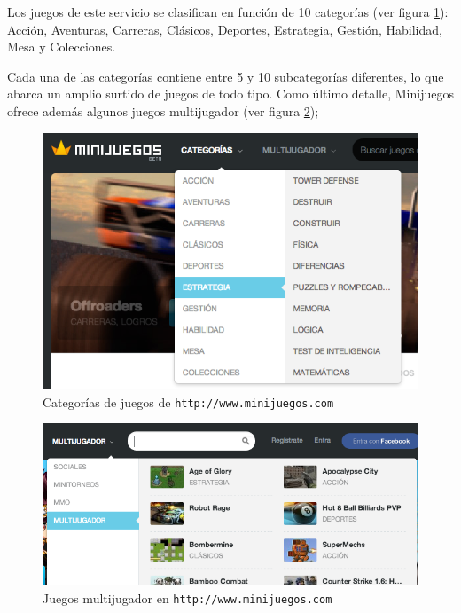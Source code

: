 Los juegos de este servicio se clasifican en función de 10 categorías (ver figura \ref{fig::cat-minijuegos}): Acción, Aventuras, Carreras, Clásicos, Deportes, Estrategia, Gestión, Habilidad, Mesa y Colecciones.

Cada una de las categorías contiene entre 5 y 10 subcategorías diferentes, lo que abarca un amplio surtido de juegos de todo tipo. Como último detalle, Minijuegos ofrece además algunos juegos multijugador (ver figura \ref{fig::minijuegos-mul});

\begin{figure}[h]
  \begin{center}
    \includegraphics[width=\textwidth]{images/minijuegos-cat.png}
    \caption{Categorías de juegos de {\tt http://www.minijuegos.com}}
    \label{fig::cat-minijuegos}
  \end{center}
\end{figure}

\begin{figure}[h]
  \begin{center}
    \includegraphics[width=\textwidth]{images/minijuegos-mul.png}
    \caption{Juegos multijugador en {\tt http://www.minijuegos.com}}
    \label{fig::minijuegos-mul}
  \end{center}
\end{figure}

